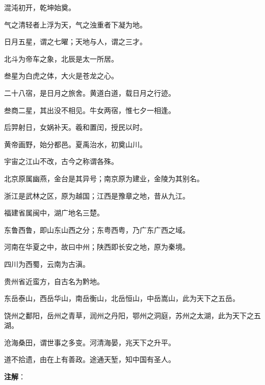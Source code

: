 \documentclass[12pt,UTF-8,openany]{ctexbook}
\begin{document}
\begin{normalsize}
    
    混沌初开，乾坤始奠。
    
    气之清轻者上浮为天，气之浊重者下凝为地。
    
    日月五星，谓之七曜；天地与人，谓之三才。
    
    北斗为帝车之象，北辰是太一所居。
    
    叁星为白虎之体，大火是苍龙之心。
    
    二十八宿，是日月之旅舍。黄道白道，载日月之行迹。
    
    叁商二星，其出没不相见。牛女两宿，惟七夕一相逢。
    
    后羿射日，女娲补天。羲和置闰，授民以时。
    
    黄帝画野，始分都邑。夏禹治水，初奠山川。
    
    宇宙之江山不改，古今之称谓各殊。
    
    北京原属幽燕，金台是其异号；南京原为建业，金陵为其别名。
    
    浙江是武林之区，原为越国；江西是豫章之地，昔从九江。
    
    福建省属闽中，湖广地名三楚。
    
    东鲁西鲁，即山东山西之分；东粤西粤，乃广东广西之域。
    
    河南在华夏之中，故曰中州；陕西即长安之地，原为秦境。
    
    四川为西蜀，云南为古滇。
    
    贵州省近蛮方，自古名为黔地。
    
    东岳泰山，西岳华山，南岳衡山，北岳恒山，中岳嵩山，此为天下之五岳。
    
    饶州之鄱阳，岳州之青草，润州之丹阳，鄂州之洞庭，苏州之太湖，此为天下之五湖。
    
    沧海桑田，谓世事之多变。河清海晏，兆天下之升平。
    
    道不拾遗，由在上有善政。途通天堑，知中国有圣人。
\end{normalsize}


\newpage

\textbf{注解}：

\vspace{-1em}
\end{document}
